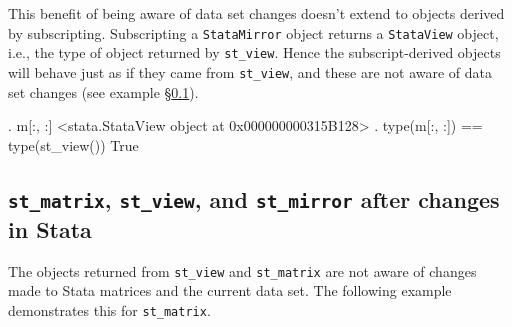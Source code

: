 \documentclass{article}
\begin{document}
\medskip

This benefit of being aware of data set changes doesn't extend to objects derived by subscripting. Subscripting a \lstinline$StataMirror$ object returns a \lstinline$StataView$ object, i.e., the type of object returned by \lstinline{st_view}. Hence the subscript-derived objects will behave just as if they came from \lstinline{st_view}, and these are not aware of data set changes (see example \S\ref{after_changes_example}).

\begin{stlog}
{\smallskip}
{\bftt{>>>}}. m[:, :]
<stata.StataView object at 0x000000000315B128>
{\smallskip}
{\bftt{>>>}}. type(m[:, :]) == type(st_view())
True
\end{stlog}

\smallskip


\subsection{\lstinline$st_matrix$, \lstinline$st_view$, and \lstinline$st_mirror$ after changes in Stata} \label{after_changes_example}

The objects returned from \lstinline{st_view} and \lstinline{st_matrix} are not aware of changes made to Stata matrices and the current data set. The following example demonstrates this for \lstinline{st_matrix}.
\end{document}
